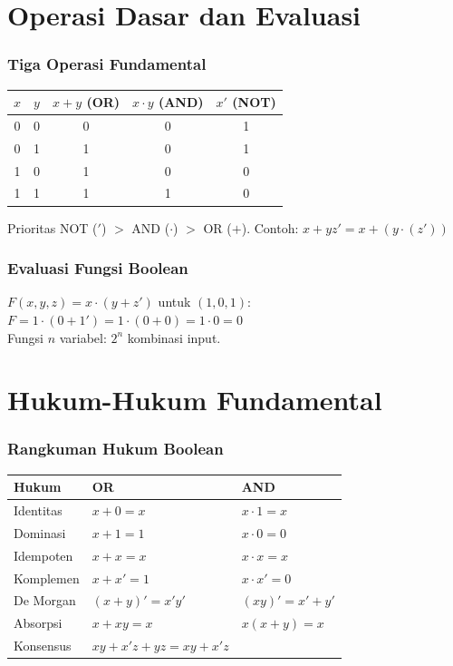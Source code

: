 \documentclass[handout]{beamer}
\theoremstyle{definition}
\theoremstyle{example}
\begin{document}
\section{Operasi Dasar dan Evaluasi}

\begin{frame}
\frametitle{Tiga Operasi Fundamental}
\begin{center}
\small
\begin{tabular}{|c|c||c|c|c|}
\hline
$x$ & $y$ & $x+y$ (OR) & $x \cdot y$ (AND) & $x'$ (NOT) \\ \hline
0 & 0 & 0 & 0 & 1 \\ \hline
0 & 1 & 1 & 0 & 1 \\ \hline
1 & 0 & 1 & 0 & 0 \\ \hline
1 & 1 & 1 & 1 & 0 \\ \hline
\end{tabular}
\end{center}
\begin{block}{Prioritas}
NOT ($'$) $>$ AND ($\cdot$) $>$ OR ($+$). Contoh: $x + yz' = x + (y \cdot (z'))$
\end{block}
\end{frame}

\begin{frame}
\frametitle{Evaluasi Fungsi Boolean}
$F(x,y,z) = x \cdot (y + z')$ untuk $(1,0,1)$:\\
$F = 1 \cdot (0 + 1') = 1 \cdot (0+0) = 1 \cdot 0 = 0$\\
Fungsi $n$ variabel: $2^n$ kombinasi input.
\end{frame}

\section{Hukum-Hukum Fundamental}

\begin{frame}
\frametitle{Rangkuman Hukum Boolean}
\begin{center}
\small
\begin{tabular}{|l|l|l|}
\hline
\textbf{Hukum} & \textbf{OR} & \textbf{AND} \\ \hline
Identitas & $x+0=x$ & $x \cdot 1 = x$ \\ \hline
Dominasi & $x+1=1$ & $x \cdot 0 = 0$ \\ \hline
Idempoten & $x+x=x$ & $x \cdot x = x$ \\ \hline
Komplemen & $x+x'=1$ & $x \cdot x' = 0$ \\ \hline
De Morgan & $(x+y)' = x'y'$ & $(xy)' = x' + y'$ \\ \hline
Absorpsi & $x + xy = x$ & $x(x+y) = x$ \\ \hline
Konsensus & $xy + x'z + yz = xy + x'z$ & \\ \hline
\end{tabular}
\end{center}
\end{frame}
\end{document}
